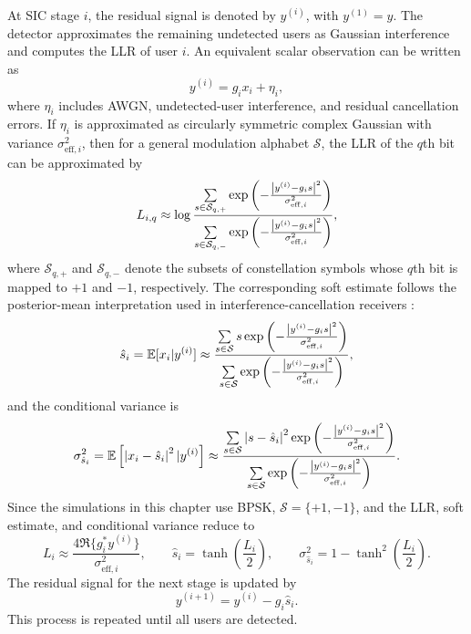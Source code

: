 At SIC stage $i$, the residual signal is denoted by $y^{(i)}$, with $y^{(1)}=y$. The detector approximates the remaining undetected users as Gaussian interference and computes the LLR of user $i$. An equivalent scalar observation can be written as
\begin{equation}
    y^{(i)} = g_i x_i + \eta_i ,
\end{equation}
where $\eta_i$ includes AWGN, undetected-user interference, and residual cancellation errors. If $\eta_i$ is approximated as circularly symmetric complex Gaussian with variance $\sigma^2_{\mathrm{eff},i}$, then for a general modulation alphabet $\mathcal{S}$, the LLR of the $q$th bit can be approximated by
\begin{equation}
    L_{i,q}
    \approx
    \log
    \frac{
    \sum\limits_{s\in\mathcal{S}_{q,+}}
    \exp\left(-\frac{\left\lvert y^{(i)}-g_i s \right\rvert^2}{\sigma^2_{\mathrm{eff},i}}\right)}
    {\sum\limits_{s\in\mathcal{S}_{q,-}}
    \exp\left(-\frac{\left\lvert y^{(i)}-g_i s \right\rvert^2}{\sigma^2_{\mathrm{eff},i}}\right)},
    \label{eq:soft-sic-llr}
\end{equation}
where $\mathcal{S}_{q,+}$ and $\mathcal{S}_{q,-}$ denote the subsets of constellation symbols whose $q$th bit is mapped to $+1$ and $-1$, respectively. The corresponding soft estimate follows the posterior-mean interpretation used in interference-cancellation receivers \cite{shapiro2005soft}:
\begin{equation}
    \hat{s}_i
    =
    \mathbb{E}[x_i|y^{(i)}]
    \approx
    \frac{
    \sum\limits_{s\in\mathcal{S}} s
    \exp\left(-\frac{\left\lvert y^{(i)}-g_i s \right\rvert^2}{\sigma^2_{\mathrm{eff},i}}\right)}
    {
    \sum\limits_{s\in\mathcal{S}}
    \exp\left(-\frac{\left\lvert y^{(i)}-g_i s \right\rvert^2}{\sigma^2_{\mathrm{eff},i}}\right)},
    \label{eq:soft-estimate}
\end{equation}
and the conditional variance is
\begin{equation}
    \sigma^2_{\hat{s}_i}
    =
    \mathbb{E}\left[\left\lvert x_i-\hat{s}_i \right\rvert^2|y^{(i)}\right]
    \approx
    \frac{
    \sum\limits_{s\in\mathcal{S}} \left\lvert s-\hat{s}_i \right\rvert^2
    \exp\left(-\frac{\left\lvert y^{(i)}-g_i s \right\rvert^2}{\sigma^2_{\mathrm{eff},i}}\right)}
    {
    \sum\limits_{s\in\mathcal{S}}
    \exp\left(-\frac{\left\lvert y^{(i)}-g_i s \right\rvert^2}{\sigma^2_{\mathrm{eff},i}}\right)}.
    \label{eq:soft-variance}
\end{equation}
Since the simulations in this chapter use BPSK, $\mathcal{S}=\{+1,-1\}$, and the LLR, soft estimate, and conditional variance reduce to
\begin{equation}
    L_i
    \approx
    \frac{4\Re\{g_i^*y^{(i)}\}}{\sigma^2_{\mathrm{eff},i}},
    \qquad
    \hat{s}_i
    =
    \tanh\left(\frac{L_i}{2}\right),
    \qquad
    \sigma^2_{\hat{s}_i}
    =
    1-\tanh^2\left(\frac{L_i}{2}\right).
\end{equation}
The residual signal for the next stage is updated by
\begin{equation}
    y^{(i+1)}=y^{(i)}-g_i\hat{s}_i .
    \label{eq:soft-sic-residual}
\end{equation}
This process is repeated until all users are detected.

